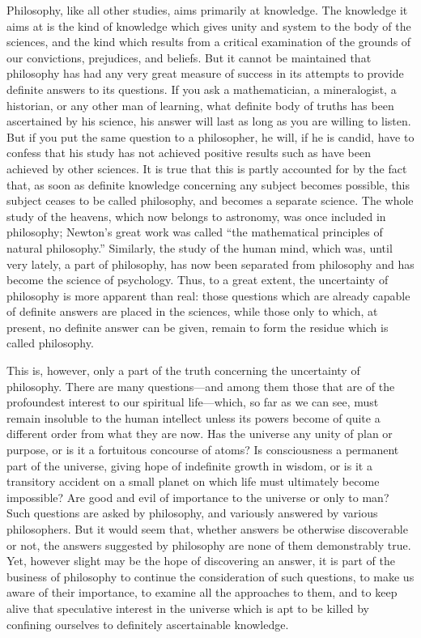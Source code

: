 Philosophy, like all other studies, aims primarily at knowledge. The
knowledge it aims at is the kind of knowledge which gives unity
and system to the body of the sciences, and the kind which results
from a critical examination of the grounds of our convictions,
prejudices, and beliefs. But it cannot be maintained that philosophy
has had any very great measure of success in its attempts to provide
definite answers to its questions. If you ask a mathematician, a
mineralogist, a historian, or any other man of learning, what definite
body of truths has been ascertained by his science, his answer will
last as long as you are willing to listen. But if you put the same
question to a philosopher, he will, if he is  candid, have
to confess that his study has not achieved positive results such as
have been achieved by other sciences. It is true that this is partly
accounted for by the fact that, as soon as definite knowledge
concerning any subject becomes possible, this subject ceases to be
called philosophy, and becomes a separate science. The whole study of
the heavens, which now belongs to astronomy, was once included in
philosophy; Newton's great work was called ``the mathematical
principles of natural philosophy.'' Similarly, the study of the human
mind, which was, until very lately, a part of philosophy, has now been
separated from philosophy and has become the science of psychology.
Thus, to a great extent, the uncertainty of philosophy is more
apparent than real: those questions which are already capable of
definite answers are placed in the sciences, while those only to
which, at present, no definite answer can be given, remain to form the
residue which is called philosophy.

This is, however, only a part of the truth concerning the uncertainty
of philosophy. There are many ques\-tions---and among them 
those that are of the profoundest interest to our spiritual
life---which, so far as we can see, must remain insoluble to the human
intellect unless its powers become of quite a different order from
what they are now. Has the universe any unity of plan or purpose, or
is it a fortuitous concourse of atoms? Is consciousness a permanent
part of the universe, giving hope of indefinite growth in wisdom, or
is it a transitory accident on a small planet on which life must
ultimately become impossible? Are good and evil of importance to the
universe or only to man? Such questions are asked by philosophy, and
variously answered by various philosophers. But it would seem that,
whether answers be otherwise discoverable or not, the answers
suggested by philosophy are none of them demonstrably true. Yet,
however slight may be the hope of discovering an answer, it is part of
the business of philosophy to continue the consideration of such
questions, to make us aware of their importance, to examine all the
approaches to them, and to keep alive that speculative interest in the
universe which is  apt to be killed by confining ourselves
to definitely ascertainable knowledge.

